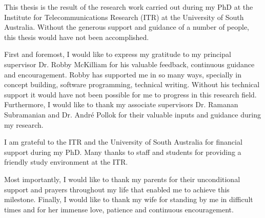 This thesis is the result of the research work carried out during my PhD at the Institute for Telecommunications Research (ITR) at the University of South Australia. Without the generous support and guidance of a number of people, this thesis would have not been accomplished.

First and foremost, I would like to express my gratitude to my principal supervisor Dr. Robby McKilliam for his valuable feedback, continuous guidance and encouragement. Robby has supported me in so many ways, specially in concept building, software programming, technical writing. Without his technical support it would have not been possible for me to progress in this research field. Furthermore, I would like to thank my associate supervisors Dr. Ramanan Subramanian and Dr. Andr\'e Pollok for their valuable inputs and guidance during my research. 

I am grateful to the ITR and the University of South Australia for financial support during my PhD. Many thanks to staff and students for providing a friendly study environment at the ITR.

Most importantly, I would like to thank my parents for their unconditional support and prayers throughout my life that enabled me to achieve this milestone. Finally, I would like to thank my wife for standing by me in difficult times and for her immense love, patience and continuous encouragement. 